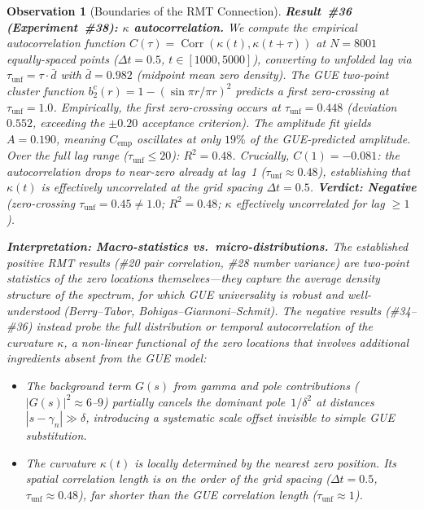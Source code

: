 \documentclass[11pt, a4paper]{article}
\theoremstyle{definition}
\theoremstyle{plain}
\newtheorem{observation}[theorem]{Observation}
\begin{document}
\begin{observation}[Boundaries of the RMT Connection]
\smallskip\noindent
\textbf{Result~\#36 (Experiment~\#38): $\kappa$ autocorrelation.}\;
We compute the empirical autocorrelation function
$C(\tau) = \operatorname{Corr}(\kappa(t), \kappa(t+\tau))$ at $N = 8001$
equally-spaced points ($\Delta t = 0.5$, $t \in [1000, 5000]$),
converting to unfolded lag via $\tau_\text{unf} = \tau \cdot \bar{d}$
with $\bar{d} = 0.982$ (midpoint mean zero density).
The GUE two-point cluster function $b_2^c(r) = 1 - (\sin\pi r/\pi r)^2$
predicts a first zero-crossing at $\tau_\text{unf} = 1.0$.
Empirically, the first zero-crossing occurs at $\tau_\text{unf} = 0.448$
(deviation $0.552$, exceeding the $\pm 0.20$ acceptance criterion).
The amplitude fit yields $A = 0.190$, meaning $C_\text{emp}$ oscillates
at only $19\%$ of the GUE-predicted amplitude.
Over the full lag range ($\tau_\text{unf} \leq 20$): $R^2 = 0.48$.
Crucially, $C(1) = -0.081$: the autocorrelation drops to near-zero
already at lag~1 ($\tau_\text{unf} \approx 0.48$), establishing that
\emph{$\kappa(t)$ is effectively uncorrelated at the grid spacing
$\Delta t = 0.5$}.
\textbf{Verdict: Negative} (zero-crossing $\tau_\text{unf} = 0.45 \neq 1.0$;
$R^2 = 0.48$; $\kappa$ effectively uncorrelated for lag $\geq 1$).

\smallskip\noindent
\textbf{Interpretation: Macro-statistics vs.\ micro-distributions.}\;
The established positive RMT results (\#20 pair correlation,
\#28 number variance) are two-point statistics of the zero
\emph{locations} themselves---they capture the average density structure
of the spectrum, for which GUE universality is robust and well-understood
(Berry--Tabor, Bohigas--Giannoni--Schmit).
The negative results (\#34--\#36) instead probe the \emph{full distribution}
or \emph{temporal autocorrelation} of the curvature $\kappa$, a
non-linear functional of the zero locations that involves additional
ingredients absent from the GUE model:
\begin{itemize}
  \item The background term $G(s)$ from gamma and pole contributions
        ($|G(s)|^2 \approx 6$--$9$) partially cancels the dominant
        pole~$1/\delta^2$ at distances $|s - \gamma_n| \gg \delta$,
        introducing a systematic scale offset invisible to simple
        GUE substitution.
  \item The curvature $\kappa(t)$ is \emph{locally determined} by the
        nearest zero position.  Its spatial correlation length is on the
        order of the grid spacing ($\Delta t = 0.5$,
        $\tau_\text{unf} \approx 0.48$), far shorter than the GUE
        correlation length ($\tau_\text{unf} \approx 1$).
\end{itemize}


\end{observation}
\end{document}

